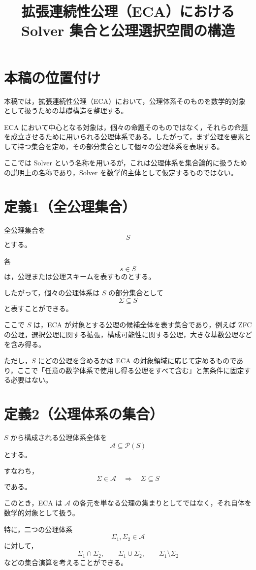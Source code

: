 \documentclass[a4paper,12pt]{article}
\title{拡張連続性公理（ECA）における Solver 集合と公理選択空間の構造}
\author{}
\date{}
\begin{document}
\maketitle

\section{本稿の位置付け}

本稿では，拡張連続性公理（ECA）において，公理体系そのものを数学的対象として扱うための基礎構造を整理する。

ECA において中心となる対象は，個々の命題そのものではなく，それらの命題を成立させるために用いられる公理体系である。したがって，まず公理を要素として持つ集合を定め，その部分集合として個々の公理体系を表現する。

ここでは Solver という名称を用いるが，これは公理体系を集合論的に扱うための説明上の名称であり，Solver を数学的主体として仮定するものではない。

\section{定義1（全公理集合）}

全公理集合を
\[
S
\]
とする。

各
\[
s\in S
\]
は，公理または公理スキームを表すものとする。

したがって，個々の公理体系は $S$ の部分集合として
\[
\Sigma\subseteq S
\]
と表すことができる。

ここで $S$ は，ECA が対象とする公理の候補全体を表す集合であり，例えば ZFC の公理，選択公理に関する拡張，構成可能性に関する公理，大きな基数公理などを含み得る。

ただし，$S$ にどの公理を含めるかは ECA の対象領域に応じて定めるものであり，ここで「任意の数学体系で使用し得る公理をすべて含む」と無条件に固定する必要はない。

\section{定義2（公理体系の集合）}

$S$ から構成される公理体系全体を
\[
\mathscr{A}\subseteq\mathcal{P}(S)
\]
とする。

すなわち，
\[
\Sigma\in\mathscr{A}
\quad\Longrightarrow\quad
\Sigma\subseteq S
\]
である。

このとき，ECA は $\mathscr{A}$ の各元を単なる公理の集まりとしてではなく，それ自体を数学的対象として扱う。

特に，二つの公理体系
\[
\Sigma_1,\Sigma_2\in\mathscr{A}
\]
に対して，
\[
\Sigma_1\cap\Sigma_2,\qquad
\Sigma_1\cup\Sigma_2,\qquad
\Sigma_1\setminus\Sigma_2
\]
などの集合演算を考えることができる。
\end{document}
